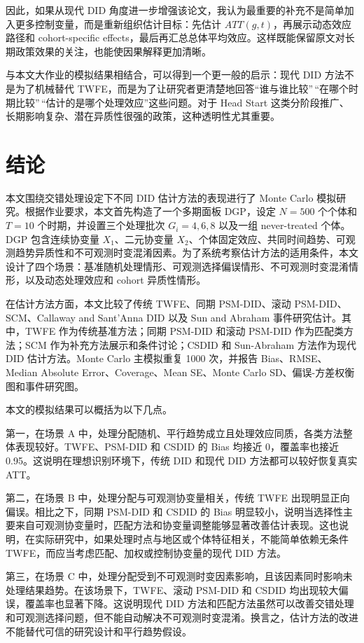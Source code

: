 \documentclass[
  fontset=windows]{ctexart}
\begin{document}
因此，如果从现代 DID
角度进一步增强该论文，我认为最重要的补充不是简单加入更多控制变量，而是重新组织估计目标：先估计
\(ATT(g,t)\)，再展示动态效应路径和 cohort-specific
effects，最后再汇总总体平均效应。这样既能保留原文对长期政策效果的关注，也能使因果解释更加清晰。

与本文大作业的模拟结果相结合，可以得到一个更一般的启示：现代 DID
方法不是为了机械替代
TWFE，而是为了让研究者更清楚地回答``谁与谁比较''\,``在哪个时期比较''\,``估计的是哪个处理效应''这些问题。对于
Head Start
这类分阶段推广、长期影响复杂、潜在异质性很强的政策，这种透明性尤其重要。

\section{结论}\label{ux7ed3ux8bba}

本文围绕交错处理设定下不同 DID 估计方法的表现进行了 Monte Carlo
模拟研究。根据作业要求，本文首先构造了一个多期面板 DGP，设定 \(N=500\)
个个体和 \(T=10\) 个时期，并设置三个处理批次 \(G_i=4,6,8\) 以及一组
never-treated 个体。DGP 包含连续协变量 \(X_1\)、二元协变量
\(X_2\)、个体固定效应、共同时间趋势、可观测趋势异质性和不可观测时变混淆因素。为了系统考察估计方法的适用条件，本文设计了四个场景：基准随机处理情形、可观测选择偏误情形、不可观测时变混淆情形，以及动态处理效应和
cohort 异质性情形。

在估计方法方面，本文比较了传统 TWFE、同期 PSM-DID、滚动
PSM-DID、SCM、Callaway and Sant'Anna DID 以及 Sun and Abraham
事件研究估计。其中，TWFE 作为传统基准方法；同期 PSM-DID 和滚动 PSM-DID
作为匹配类方法；SCM 作为补充方法展示和条件讨论；CSDID 和 Sun-Abraham
方法作为现代 DID 估计方法。Monte Carlo 主模拟重复 1000 次，并报告
Bias、RMSE、Median Absolute Error、Coverage、Mean SE、Monte Carlo
SD、偏误-方差权衡图和事件研究图。

本文的模拟结果可以概括为以下几点。

第一，在场景 A
中，处理分配随机、平行趋势成立且处理效应同质，各类方法整体表现较好。TWFE、PSM-DID
和 CSDID 的 Bias 均接近 0，覆盖率也接近
0.95。这说明在理想识别环境下，传统 DID 和现代 DID 方法都可以较好恢复真实
ATT。

第二，在场景 B 中，处理分配与可观测协变量相关，传统 TWFE
出现明显正向偏误。相比之下，同期 PSM-DID 和 CSDID 的 Bias
明显较小，说明当选择性主要来自可观测协变量时，匹配方法和协变量调整能够显著改善估计表现。这也说明，在实际研究中，如果处理时点与地区或个体特征相关，不能简单依赖无条件
TWFE，而应当考虑匹配、加权或控制协变量的现代 DID 方法。

第三，在场景 C
中，处理分配受到不可观测时变因素影响，且该因素同时影响未处理结果趋势。在该场景下，TWFE、滚动
PSM-DID 和 CSDID 均出现较大偏误，覆盖率也显著下降。这说明现代 DID
方法和匹配方法虽然可以改善交错处理和可观测选择问题，但不能自动解决不可观测时变混淆。换言之，估计方法的改进不能替代可信的研究设计和平行趋势假设。
\end{document}
